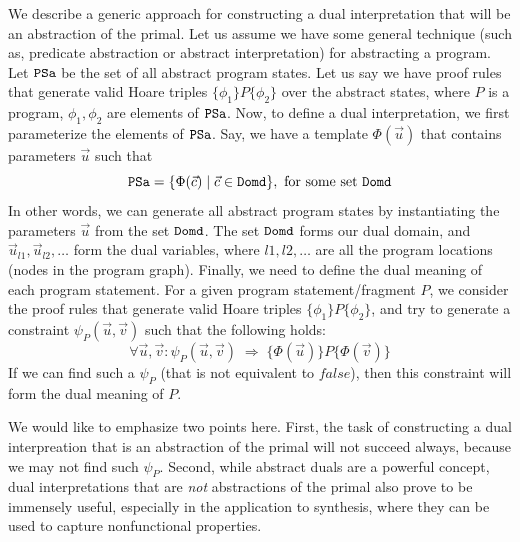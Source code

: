 \documentclass[preprint]{sig-alternate-05-2015}
\def\psa{{\tt{PSa}}}
\def\domd{{\tt{Domd}}}
\begin{document}
We describe a generic approach for constructing a dual interpretation
that will be an abstraction of the primal. 
Let us assume we have some general technique (such as, predicate
abstraction or abstract interpretation) for abstracting a program.
Let $\psa$ be the set of all abstract program states.
Let us say we have proof rules that generate valid Hoare triples
$\{\phi_1\}P\{\phi_2\}$ over the abstract states, where $P$ is a program,
$\phi_1,\phi_2$ are elements of $\psa$.
Now, to define a dual interpretation, we first parameterize the elements
of $\psa$. Say, we have a template $\Phi(\vec{u})$ that contains parameters
$\vec{u}$ such that 
$$\psa = \{\Phi(\vec{c}) \mid \vec{c}\in\domd\}, \mbox{ for some set $\domd$}$$
In other words, we can generate all abstract program states
by instantiating the parameters $\vec{u}$ from the set $\domd$.
The set $\domd$ forms our dual domain, and 
$\vec{u}_{l1},\vec{u}_{l2},\ldots$ form the dual variables, where
$l1,l2,\ldots$ are all the program locations (nodes in the program graph).
Finally, we need to define the dual meaning of each program statement.
For a given program statement/fragment $P$, we consider the proof rules
that generate valid Hoare triples $\{\phi_1\}P\{\phi_2\}$, and try to generate
a constraint $\psi_P(\vec{u},\vec{v})$ such that the following holds:
$$
 \forall \vec{u},\vec{v}:
 \psi_P(\vec{u},\vec{v}) \;\Rightarrow\;
 \{\Phi(\vec{u})\}P\{\Phi(\vec{v})\}
$$
If we can find such a $\psi_P$ (that is not equivalent to $\mathit{false}$),
then this constraint will form the dual meaning of $P$.

We would like to emphasize two points here. 
First,
the task of constructing a dual interpreation that
is an abstraction of the primal will not succeed always, because we may
not find such $\psi_P$.
Second, while abstract duals are a powerful concept, dual interpretations
that are {\em{not}} abstractions of the primal also prove to be
immensely useful, especially in the application to synthesis, where they
can be used to capture nonfunctional properties.
\end{document}
